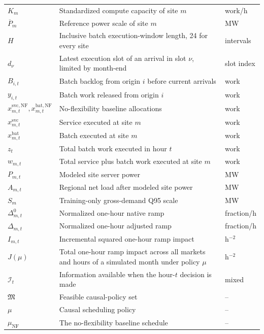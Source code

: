 \documentclass[conference]{IEEEtran}
\begin{document}
\begin{longtable}{@{}L{0.18\textwidth}L{0.56\textwidth}L{0.18\textwidth}@{}}
  \(K_m\) & Standardized compute capacity of site \(m\) & work/h \\
  \(\overline P_m\) & Reference power scale of site \(m\) & MW \\
  \(H\) & Inclusive batch execution-window length, 24 for every site & intervals \\
  \(d_{\nu}\) & Latest execution slot of an arrival in slot \(\nu\), limited by month-end & slot index \\
  \(B_{i,t}\) & Batch backlog from origin \(i\) before current arrivals & work \\
  \(y_{i,t}\) & Batch work released from origin \(i\) & work \\
  \(x^{\mathrm{svc},\mathrm{NF}}_{m,t},x^{\mathrm{bat},\mathrm{NF}}_{m,t}\) & No-flexibility baseline allocations & work \\
  \(x^{\mathrm{svc}}_{m,t}\) & Service executed at site \(m\) & work \\
  \(x^{\mathrm{bat}}_{m,t}\) & Batch executed at site \(m\) & work \\
  \(z_t\) & Total batch work executed in hour \(t\) & work \\
  \(w_{m,t}\) & Total service plus batch work executed at site \(m\) & work \\
  \(P_{m,t}\) & Modeled site server power & MW \\
  \(A_{m,t}\) & Regional net load after modeled site power & MW \\
  \(S_m\) & Training-only gross-demand Q95 scale & MW \\
  \(\Delta^0_{m,t}\) & Normalized one-hour native ramp & fraction/h \\
  \(\Delta_{m,t}\) & Normalized one-hour adjusted ramp & fraction/h \\
  \(I_{m,t}\) & Incremental squared one-hour ramp impact & h\(^{-2}\) \\
  \(J(\mu)\) & Total one-hour ramp impact across all markets and hours of a simulated month under policy \(\mu\) & h\(^{-2}\) \\
  \(\mathcal I_t\) & Information available when the hour-\(t\) decision is made & mixed \\
  \(\mathfrak M\) & Feasible causal-policy set & -- \\
  \(\mu\) & Causal scheduling policy & -- \\
  \(\mu_{\mathrm{NF}}\) & The no-flexibility baseline schedule & -- \\
  \bottomrule
\end{longtable}
\end{document}

